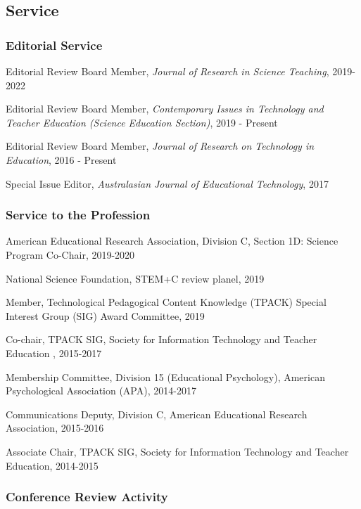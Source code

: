 \documentclass[14,]{article}
\begin{document}
\hypertarget{service}{%
\subsection{Service}\label{service}}

\hypertarget{editorial-service}{%
\subsubsection{Editorial Service}\label{editorial-service}}

Editorial Review Board Member, \emph{Journal of Research in Science
Teaching}, 2019-2022

Editorial Review Board Member, \emph{Contemporary Issues in Technology
and Teacher Education (Science Education Section)}, 2019 - Present

Editorial Review Board Member, \emph{Journal of Research on Technology
in Education}, 2016 - Present

Special Issue Editor, \emph{Australasian Journal of Educational
Technology}, 2017

\hypertarget{service-to-the-profession}{%
\subsubsection{Service to the
Profession}\label{service-to-the-profession}}

American Educational Research Association, Division C, Section 1D:
Science Program Co-Chair, 2019-2020

National Science Foundation, STEM+C review planel, 2019

Member, Technological Pedagogical Content Knowledge (TPACK) Special
Interest Group (SIG) Award Committee, 2019

Co-chair, TPACK SIG, Society for Information Technology and Teacher
Education , 2015-2017

Membership Committee, Division 15 (Educational Psychology), American
Psychological Association (APA), 2014-2017

Communications Deputy, Division C, American Educational Research
Association, 2015-2016

Associate Chair, TPACK SIG, Society for Information Technology and
Teacher Education, 2014-2015

\hypertarget{conference-review-activity}{%
\subsubsection{Conference Review
Activity}\label{conference-review-activity}}
\end{document}
